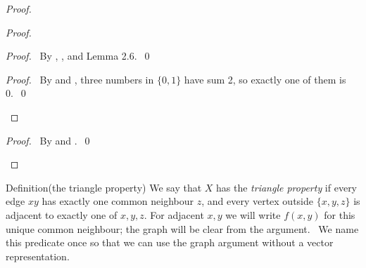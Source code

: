 \begin{proof}
\begin{proof}
    \begin{proof}
      \pf\ By , ,  and Lemma 2.6.~\qed
    \end{proof}

    \qedstep
    \begin{proof}
      \pf\ By  and , three numbers in $\{0,1\}$ have sum 2, so exactly
      one of them is 0.~\qed
    \end{proof}
  \end{proof}

  \qedstep
  \begin{proof}
    \pf\ By  and .~\qed
  \end{proof}
\end{proof}

\begin{namedresult}{Definition}{(the triangle property)}\label{def:triangle-property}
 \uses{}
 We say that $X$ has the \emph{triangle property} if every edge $xy$ has exactly one
 common neighbour $z$, and every vertex outside $\{x,y,z\}$ is adjacent to exactly one
 of $x,y,z$. For adjacent $x,y$ we will write $f(x,y)$ for this unique common neighbour;
 the graph will be clear from the argument.
 \new\ We name this predicate once so that we can use the graph argument without a vector
 representation.
\end{namedresult}

